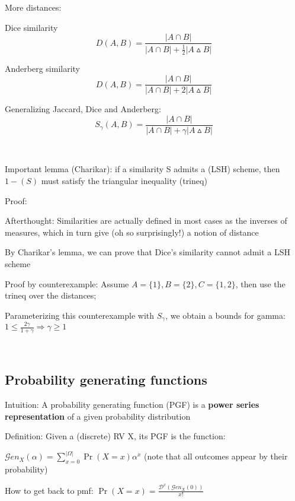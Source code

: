 \documentclass{report}
\begin{document}
	More distances:
	
	Dice similarity
	\begin{equation}
	\displaystyle D(A, B) = \frac{|A\cap B|}{|A\cap B| + \frac{1}{2}|A\vartriangle B|}
	\end{equation}
	
	Anderberg similarity
	\begin{equation}
	\displaystyle D(A, B) = \frac{|A\cap B|}{|A\cap B| + 2|A\vartriangle B|}
	\end{equation}
	
	Generalizing Jaccard, Dice and Anderberg: 
	\begin{equation}
	\displaystyle S_\gamma(A, B) = \frac{|A\cap B|}{|A\cap B| + \gamma|A\vartriangle B|}
	\end{equation}
	
	\
	
	Important lemma (Charikar): if a similarity S admits a (LSH) scheme, then $1-(S)$ must satisfy the triangular inequality (trineq)
	
	Proof: %
	
	Afterthought: Similarities are actually defined in most cases as the inverses of measures, which in turn give (oh so surprisingly!) a notion of distance
	\
	
	By Charikar's lemma, we can prove that Dice's similarity cannot admit a LSH scheme
	
	Proof by counterexample: Assume $A=\{1\}, B=\{2\}, C=\{1, 2\}$, then use the trineq over the distances; %
	
	Parameterizing this counterexample with $S_\gamma$, we obtain a bounds for gamma: $1 \leq \frac{2\gamma}{1 + \gamma} \Rightarrow \gamma \geq 1$
	
	\
	
	\subsection{Probability generating functions}
	
	Intuition: A probability generating function (PGF) is a \textbf{power series representation} of a given probability distribution
	
	Definition: Given a (discrete) RV X, its PGF is the function:
	
	$\displaystyle \mathcal{G}en_X(\alpha)= \sum_{x=0}^{|\Omega|}\Pr(X=x)\alpha^x$ (note that all outcomes appear by their probability)
	
	How to get back to pmf: $\displaystyle \Pr(X=x) = \frac{\mathcal{D}^x(\mathcal{G}en_X(0))}{x!}$
	
\end{document}
